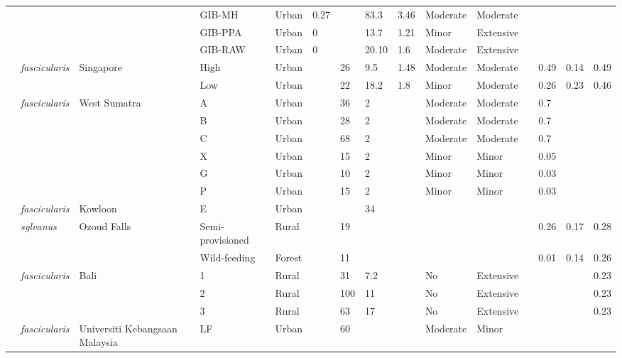 \documentclass[american]{../../../coursework}
\begin{document}
\begin{landscape}
\begin{longtabu}{X[L,2]X[1.1]XX[1.25]XXXXXXXX[0.75]X[0.5]XX}
            &  &  & GIB-MH & Urban & 0.27 &  & 83.3 & 3.46 & Moderate & Moderate &  &  &  &  \\
            &  &  & GIB-PPA & Urban & 0 &  & 13.7 & 1.21 & Minor & Extensive &  &  &  &  \\
            &  &  & GIB-RAW & Urban & 0 &  & 20.10 & 1.6 & Moderate & Extensive &  &  &  &  \\
         \textcite{Sha13} & \textit{fascicularis} & Singapore & High & Urban &  & 26 & 9.5 & 1.48 & Moderate & Moderate &  & 0.49 & 0.14 & 0.49 \\
            &  &  & Low & Urban &  & 22 & 18.2 & 1.8 & Minor & Moderate &  & 0.26 & 0.23 & 0.46 \\
         \textcite{Ilh17} & \textit{fascicularis} & West Sumatra & A & Urban &  & 36 & 2 &  & Moderate & Moderate &  & 0.7 &  &  \\
            &  &  & B & Urban &  & 28 & 2 &  & Moderate & Moderate &  & 0.7 &  &  \\
            &  &  & C & Urban &  & 68 & 2 &  & Moderate & Moderate &  & 0.7 &  &  \\
            &  &  & X & Urban &  & 15 & 2 &  & Minor & Minor &  & 0.05 &  &  \\
            &  &  & G & Urban &  & 10 & 2 &  & Minor & Minor &  & 0.03 &  &  \\
            &  &  & P & Urban &  & 15 & 2 &  & Minor & Minor &  & 0.03 &  &  \\
         \textcite{Won94} & \textit{fascicularis} & Kowloon & E & Urban &  &  & 34 &  &  &  &  &  &  &  \\
         \textcite{ElA12} & \textit{sylvanus} & Ozoud Falls & Semi-provisioned & Rural &  & 19 &  &  &  &  &  & 0.26 & 0.17 & 0.28 \\
            &  &  & Wild-feeding & Forest &  & 11 &  &  &  &  &  & 0.01 & 0.14 & 0.26 \\
         \textcite{Fue11} & \textit{fascicularis} & Bali & 1 & Rural &  & 31 & 7.2 &  & No & Extensive &  &  &  & 0.23 \\
            &  &  & 2 & Rural &  & 100 & 11 &  & No & Extensive &  &  &  & 0.23 \\
            &  &  & 3 & Rural &  & 63 & 17 &  & No & Extensive &  &  &  & 0.23 \\
         \textcite{MdZain2011} & \textit{fascicularis} & Universiti Kebangsaan Malaysia & LF & Urban &  & 60 &  &  & Moderate & Minor &  &  &  &  \\

\end{longtabu}
\end{landscape}
\end{document}

